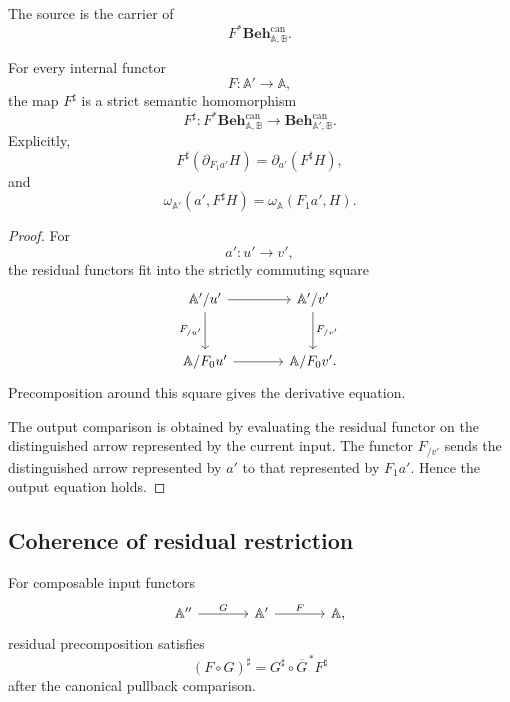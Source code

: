 The source is the carrier of
\[
    F^\ast
    \mathbf{Beh}^{\mathrm{can}}_{\mathbb A,\mathbb B}.
\]

\begin{theorem}
\label{thm:strictness-residual-restriction}
For every internal functor
\[
    F:\mathbb A'\to\mathbb A,
\]
the map \(F^\sharp\) is a strict semantic homomorphism
\[
    F^\sharp:
    F^\ast
    \mathbf{Beh}^{\mathrm{can}}_{\mathbb A,\mathbb B}
    \to
    \mathbf{Beh}^{\mathrm{can}}_{\mathbb A',\mathbb B}.
\]
Explicitly,
\[
    F^\sharp
    \left(
        \partial_{F_1a'}H
    \right)
    =
    \partial_{a'}
    \left(
        F^\sharp H
    \right),
\]
and
\[
    \omega_{\mathbb A'}
    \left(
        a',
        F^\sharp H
    \right)
    =
    \omega_{\mathbb A}
    \left(
        F_1a',
        H
    \right).
\]
\end{theorem}

\begin{proof}
For
\[
    a':u'\to v',
\]
the residual functors fit into the strictly commuting square
\[
\begin{tikzcd}[column sep=large,row sep=large]
    \mathbb A'/u'
        \arrow[r]
        \arrow[d, "F_{/u'}"']
    &
    \mathbb A'/v'
        \arrow[d, "F_{/v'}"]
    \\
    \mathbb A/F_0u'
        \arrow[r]
    &
    \mathbb A/F_0v'.
\end{tikzcd}
\]
Precomposition around this square gives the derivative equation.

The output comparison is obtained by evaluating the residual functor on the
distinguished arrow represented by the current input. The functor
\(F_{/v'}\) sends the distinguished arrow represented by \(a'\) to that
represented by \(F_1a'\). Hence the output equation holds.
\end{proof}

\subsection{Coherence of residual restriction}
\label{subsec:coherence-residual-restriction}

For composable input functors
\[
\begin{tikzcd}[column sep=large]
    \mathbb A''
        \arrow[r, "G"]
    &
    \mathbb A'
        \arrow[r, "F"]
    &
    \mathbb A,
\end{tikzcd}
\]
residual precomposition satisfies
\[
    (F\circ G)^\sharp
    =
    G^\sharp
    \circ
    \overline G^{\,\ast}F^\sharp
\]
after the canonical pullback comparison.


